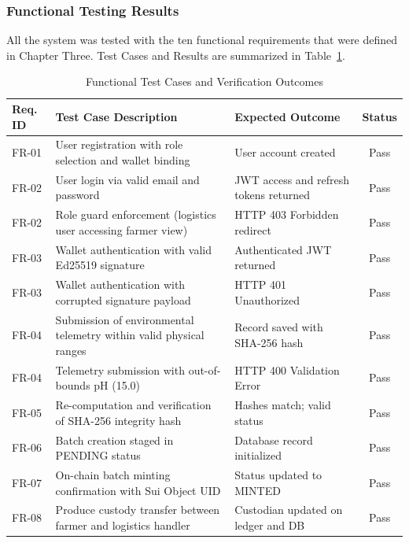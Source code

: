 \subsubsection*{Functional Testing Results}

All the system was tested with the ten functional requirements that were defined in Chapter Three. Test Cases and Results are summarized in Table~\ref{tab:test_results}.

\clearpage
\begin{table}[H]
\centering
\small
\singlespacing
\renewcommand{\arraystretch}{1.12}
\caption{Functional Test Cases and Verification Outcomes}
\label{tab:test_results}
\begin{tabularx}{\textwidth}{|l|>{\raggedright\arraybackslash}X|>{\raggedright\arraybackslash}p{4.2cm}|c|}
\hline
\textbf{Req. ID} & \textbf{Test Case Description} & \textbf{Expected Outcome} & \textbf{Status} \\
\hline
FR-01 & User registration with role selection and wallet binding & User account created & Pass \\
\hline
FR-02 & User login via valid email and password & JWT access and refresh tokens returned & Pass \\
\hline
FR-02 & Role guard enforcement (logistics user accessing farmer view) & HTTP 403 Forbidden redirect & Pass \\
\hline
FR-03 & Wallet authentication with valid Ed25519 signature & Authenticated JWT returned & Pass \\
\hline
FR-03 & Wallet authentication with corrupted signature payload & HTTP 401 Unauthorized & Pass \\
\hline
FR-04 & Submission of environmental telemetry within valid physical ranges & Record saved with SHA-256 hash & Pass \\
\hline
FR-04 & Telemetry submission with out-of-bounds pH (15.0) & HTTP 400 Validation Error & Pass \\
\hline
FR-05 & Re-computation and verification of SHA-256 integrity hash & Hashes match; valid status & Pass \\
\hline
FR-06 & Batch creation staged in PENDING status & Database record initialized & Pass \\
\hline
FR-07 & On-chain batch minting confirmation with Sui Object UID & Status updated to MINTED & Pass \\
\hline
FR-08 & Produce custody transfer between farmer and logistics handler & Custodian updated on ledger and DB & Pass \\

\end{tabularx}
\end{table}
